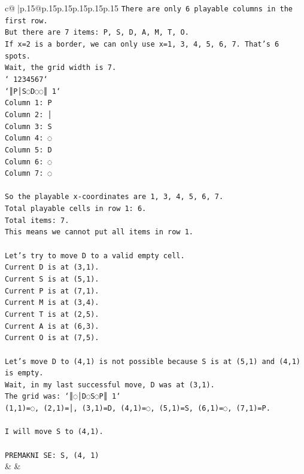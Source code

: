 \documentclass{article}
\begin{document}
{\begin{supertabular}{c@{$\;$}|p{.15\linewidth}@{}p{.15\linewidth}p{.15\linewidth}p{.15\linewidth}p{.15\linewidth}p{.15\linewidth}}
{{{\texttt{There are only 6 playable columns in the first row.} \\
\texttt{But there are 7 items: P, S, D, A, M, T, O.} \\
\texttt{If x=2 is a border, we can only use x=1, 3, 4, 5, 6, 7. That's 6 spots.} \\
\texttt{Wait, the grid width is 7.} \\
\texttt{` 1234567`} \\
\texttt{`║P│S◌D◌◌║ 1`} \\
\texttt{Column 1: P} \\
\texttt{Column 2: │} \\
\texttt{Column 3: S} \\
\texttt{Column 4: ◌} \\
\texttt{Column 5: D} \\
\texttt{Column 6: ◌} \\
\texttt{Column 7: ◌} \\
\\ 
\texttt{So the playable x{-}coordinates are 1, 3, 4, 5, 6, 7.} \\
\texttt{Total playable cells in row 1: 6.} \\
\texttt{Total items: 7.} \\
\texttt{This means we cannot put all items in row 1.} \\
\\ 
\texttt{Let's try to move D to a valid empty cell.} \\
\texttt{Current D is at (3,1).} \\
\texttt{Current S is at (5,1).} \\
\texttt{Current P is at (7,1).} \\
\texttt{Current M is at (3,4).} \\
\texttt{Current T is at (2,5).} \\
\texttt{Current A is at (6,3).} \\
\texttt{Current O is at (7,5).} \\
\\ 
\texttt{Let's move D to (4,1) is not possible because S is at (5,1) and (4,1) is empty.} \\
\texttt{Wait, in my last successful move, D was at (3,1).} \\
\texttt{The grid was: `║◌│D◌S◌P║ 1`} \\
\texttt{(1,1)=◌, (2,1)=│, (3,1)=D, (4,1)=◌, (5,1)=S, (6,1)=◌, (7,1)=P.} \\
\\ 
\texttt{I will move S to (4,1).} \\
\\ 
\texttt{PREMAKNI SE: S, (4, 1)} \\
            }
        }
    }
    & & \\ \\


\end{supertabular}}
\end{document}
